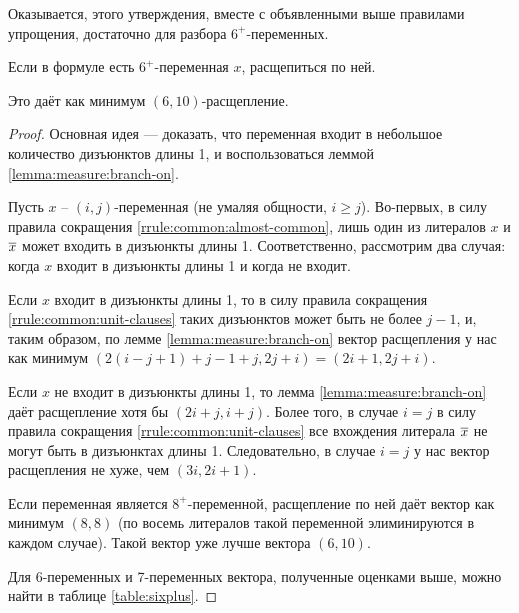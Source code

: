 Оказывается, этого утверждения, вместе с объявленными выше правилами упрощения, достаточно для разбора $6^+$-переменных.

\begin{brule}
 Если в формуле есть $6^+$-переменная $x$, расщепиться по ней.

 Это даёт как минимум $(6,10)$-расщепление.
 \label{brule:measure:sixplus}
\end{brule}

\begin{proof}
 Основная идея — доказать, что переменная входит в небольшое количество дизъюнктов длины 1, и воспользоваться леммой \ref{lemma:measure:branch-on}.

 Пусть $x$ -- $(i,j)$-переменная (не умаляя общности, $i \geq j$). Во-первых, в силу правила сокращения \ref{rrule:common:almost-common}, лишь один из литералов $x$ и $\overline{x}$ может входить в дизъюнкты длины 1. Соответственно, рассмотрим два случая: когда $x$ входит в дизъюнкты длины 1 и когда не входит.

 Если $x$ входит в дизъюнкты длины 1, то в силу правила сокращения \ref{rrule:common:unit-clauses} таких дизъюнктов может быть не более $j - 1$, и, таким образом, по лемме \ref{lemma:measure:branch-on} вектор расщепления у нас как минимум $(2(i - j + 1) + j - 1 + j, 2j + i) = (2i + 1, 2j + i)$.

 Если $x$ не входит в дизъюнкты длины 1, то лемма \ref{lemma:measure:branch-on} даёт расщепление хотя бы $(2i + j, i + j)$. Более того, в случае $i = j$ в силу правила сокращения \ref{rrule:common:unit-clauses} все вхождения литерала $\overline{x}$ не могут быть в дизъюнктах длины 1. Следовательно, в случае $i = j$ у нас вектор расщепления не хуже, чем $(3i, 2i + 1)$.

 Если переменная является $8^+$-переменной, расщепление по ней даёт вектор как минимум $(8,8)$ (по восемь литералов такой переменной элиминируются в каждом случае). Такой вектор уже лучше вектора $(6,10)$.

 Для 6-переменных и 7-переменных вектора, полученные оценками выше, можно найти в таблице \ref{table:sixplus}.


\end{proof}
